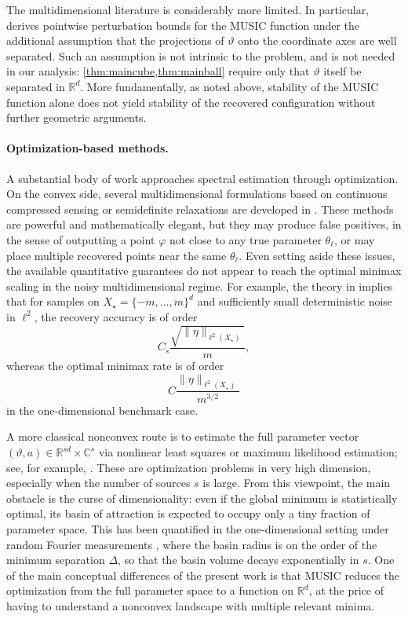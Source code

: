 \documentclass[11pt]{article}
\theoremstyle{definition}
\numberwithin{theorem}{section}
\numberwithin{lemma}{section}
\numberwithin{equation}{section}
\def\C{\mathbb{C}}
\def\R{\mathbb{R}}
\newcommand{\sampset}{X}
\newcommand{\bfa}{a}
\numberwithin{equation}{section}
\begin{document}
The multidimensional literature is considerably more limited. In particular, \cite{liao2015multi} derives pointwise perturbation bounds for the MUSIC function under the additional assumption that the projections of $\vartheta$ onto the coordinate axes are well separated. Such an assumption is not intrinsic to the problem, and is not needed in our analysis: \cref{thm:maincube,thm:mainball} require only that $\vartheta$ itself be separated in $\R^d$. More fundamentally, as noted above, stability of the MUSIC function alone does not yield stability of the recovered configuration without further geometric arguments.

\paragraph{Optimization-based methods.}
A substantial body of work approaches spectral estimation through optimization. On the convex side, several multidimensional formulations based on continuous compressed sensing or semidefinite relaxations are developed in \cite{de2016exact,poon2019multidimensional,poon2023geometry}. These methods are powerful and mathematically elegant, but they may produce false positives, in the sense of outputting a point $\varphi$ not close to any true parameter $\theta_\ell$, or may place multiple recovered points near the same $\theta_\ell$. Even setting aside these issues, the available quantitative guarantees do not appear to reach the optimal minimax scaling in the noisy multidimensional regime. For example, the theory in \cite{poon2023geometry} implies that for samples on $\sampset_\star=\{-m,\dots,m\}^d$ and sufficiently small deterministic noise in $\ell^2$, the recovery accuracy is of order
\[
C_s \frac{\sqrt{\|\eta\|_{\ell^2(\sampset_\star)}}}{m},
\]
whereas the optimal minimax rate is of order
\[
C\frac{\|\eta\|_{\ell^2(\sampset_\star)}}{m^{3/2}}
\]
in the one-dimensional benchmark case.

A more classical nonconvex route is to estimate the full parameter vector $(\vartheta,\bfa)\in\R^{sd}\times \C^s$ via nonlinear least squares or maximum likelihood estimation; see, for example, \cite{stoica2002maximum,traonmilin2020basins}. These are optimization problems in very high dimension, especially when the number of sources $s$ is large. From this viewpoint, the main obstacle is the curse of dimensionality: even if the global minimum is statistically optimal, its basin of attraction is expected to occupy only a tiny fraction of parameter space. This has been quantified in the one-dimensional setting under random Fourier measurements \cite{traonmilin2020basins}, where the basin radius is on the order of the minimum separation $\Delta$, so that the basin volume decays exponentially in $s$. One of the main conceptual differences of the present work is that MUSIC reduces the optimization from the full parameter space to a function on $\R^d$, at the price of having to understand a nonconvex landscape with multiple relevant minima.
\end{document}
